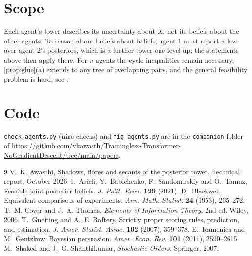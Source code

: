 \documentclass[11pt]{article}
\theoremstyle{definition}
\theoremstyle{remark}
\begin{document}
\section*{Scope}
Each agent's tower describes its uncertainty about $X$, not its beliefs about the other agents. To reason about beliefs about beliefs,
agent $1$ must report a law over agent $2$'s posteriors, which is a further tower one level up; the statements above then apply there. For
$n$ agents the cycle inequalities remain necessary, \cref{prop:glue}(a) extends to any tree of overlapping pairs, and the general
feasibility problem is hard; see \cite{ArieliEtAl2021}.

\section*{Code}
\texttt{check\_agents.py} (nine checks) and \texttt{fig\_agents.py} are in the \texttt{companion} folder of
\url{https://github.com/vkawasth/Trainingless-Transformer-NoGradientDescent/tree/main/papers}.

\begin{thebibliography}{9}
 V.~K. Awasthi, Shadows, fibres and secants of the posterior tower. Technical report, October 2026.
 I.~Arieli, Y.~Babichenko, F.~Sandomirskiy and O.~Tamuz, Feasible joint posterior beliefs. \emph{J. Polit. Econ.}
  \textbf{129} (2021).
 D.~Blackwell, Equivalent comparisons of experiments. \emph{Ann. Math. Statist.} \textbf{24} (1953), 265--272.
 T.~M. Cover and J.~A. Thomas, \emph{Elements of Information Theory}, 2nd ed. Wiley, 2006.
 T.~Gneiting and A.~E. Raftery, Strictly proper scoring rules, prediction, and estimation. \emph{J. Amer.
  Statist. Assoc.} \textbf{102} (2007), 359--378.
 E.~Kamenica and M.~Gentzkow, Bayesian persuasion. \emph{Amer. Econ. Rev.} \textbf{101} (2011), 2590--2615.
 M.~Shaked and J.~G. Shanthikumar, \emph{Stochastic Orders}. Springer, 2007.
\end{thebibliography}
\end{document}
